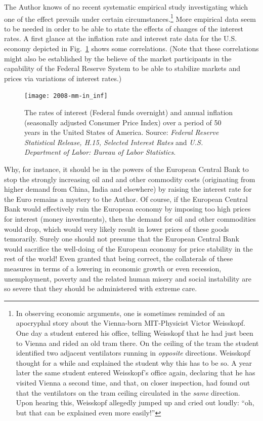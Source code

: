\documentclass[aps,rmp,preprint,amsfonts,showpacs,showkeys]{revtex4}
\begin{document}
The Author knows of no recent systematic empirical study investigating which one of the effect prevails under certain circumstances.\footnote{
In observing  economic arguments, one is sometimes reminded of an apocryphal story about the Vienna-born MIT-Physicist Victor Weisskopf.
One day a student entered his office, telling Weisskopf that he had just been to Vienna and rided an old tram there. On the ceiling of the tram the
student identified
two adjacent ventilators running in {\em opposite} directions. Weisskopf thought for a while and explained the student why this has to be so.
A year later the same student entered Weisskopf's office again, declaring that he has visited Vienna a second time, and that,
on closer inspection, had found out that
the ventilators on the tram ceiling circulated in the {\em same} direction. Upon hearing this, Weisskopf allegedly jumped up and cried out loudly:
``oh, but that can be explained even more easily!''}
More empirical data seem to be needed in order to be able to state the effects
of changes of the interest rates.
A first glance at the inflation rate and interest rate data for the
U.S. economy depicted in Fig.~\ref{2008-mm-in_inf} shows some correlations.
(Note that these correlations might also be established by the believe of the market participants in the capability of the
Federal Reserve System to be able to stabilize markets and prices via variations of interest rates.)
\begin{figure}
\begin{center}
 \texttt{[image: 2008-mm-in\_inf]}
\end{center}
\caption{The rates of interest (Federal funds overnight) and annual inflation (seasonally adjusted Consumer Price Index)
over a period of 50 years in the United States of America. Source:  {\em Federal Reserve Statistical Release, H.15, Selected Interest Rates}
and
{\it U.S. Department of Labor: Bureau of Labor Statistics}.}
\label{2008-mm-in_inf}
\end{figure}

Why, for instance, it should be in the powers of the European Central Bank
to stop the strongly increasing oil  and
and other commodity costs (originating from higher demand from China, India and elsewhere)
 by raising the interest rate for the Euro remains a mystery to the Author.
Of course, if the European Central Bank would effectively ruin the European economy by imposing too high prices for interest
(money investments), then the demand for oil and other commodities would drop, which would very likely result in
lower prices of these goods temorarily.
Surely one should not presume that the European Central Bank would sacrifice the well-doing of the
European economy for price stability in the rest of the world!
Even granted that being correct, the collaterals of these measures in terms of a lowering in economic growth or even recession, unemployment, poverty
and the related human misery and social instability are so severe that they should be administered with extreme care.
\end{document}
